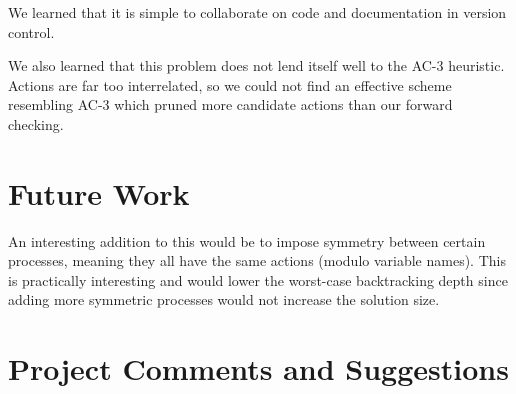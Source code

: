 We learned that it is simple to collaborate on code and documentation in version control.

We also learned that this problem does not lend itself well to the AC-3 heuristic.
Actions are far too interrelated, so we could not find an effective scheme resembling AC-3 which pruned more candidate actions than our forward checking.

\section{Future Work}

An interesting addition to this would be to impose symmetry between certain processes, meaning they all have the same actions (modulo variable names).
This is practically interesting and would lower the worst-case backtracking depth since adding more symmetric processes would not increase the solution size.

\section{Project Comments and Suggestions}










